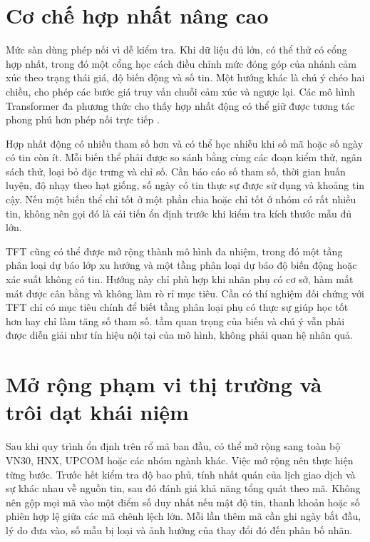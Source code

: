 \section{Cơ chế hợp nhất nâng cao}

Mức sàn dùng phép nối vì dễ kiểm tra. Khi dữ liệu đủ lớn, có thể thử có cổng hợp nhất, trong
đó một cổng học cách điều chỉnh mức đóng góp của nhánh cảm xúc theo trạng thái giá,
độ biến động và số tin. Một hướng khác là chú ý chéo hai chiều, cho phép các bước
giá truy vấn chuỗi cảm xúc và ngược lại. Các mô hình Transformer đa phương thức cho
thấy hợp nhất động có thể giữ được tương tác phong phú hơn phép nối trực tiếp
\cite{Omranpour2024_241210540v1,Elahi2024_241101368v1}.

Hợp nhất động có nhiều tham số hơn và có thể học nhiễu khi số mã hoặc số ngày có tin còn
ít. Mỗi biến thể phải được so sánh bằng cùng các đoạn kiểm thử, ngân sách thử, loại bỏ đặc
trưng và chỉ số. Cần báo cáo số tham số, thời gian huấn luyện, độ nhạy theo hạt giống, số
ngày có tin thực sự được sử dụng và khoảng tin cậy. Nếu một biến thể chỉ tốt ở một phần
chia hoặc chỉ tốt ở nhóm có rất nhiều tin, không nên gọi đó là cải tiến ổn định trước khi
kiểm tra kích thước mẫu đủ lớn.

TFT cũng có thể được mở rộng thành mô hình đa nhiệm, trong đó một tầng phân loại dự báo lớp xu
hướng và một tầng phân loại dự báo độ biến động hoặc xác suất không có tin. Hướng này chỉ phù hợp
khi nhãn phụ có cơ sở, hàm mất mát được cân bằng và không làm rò rỉ mục tiêu. Cần có thí nghiệm
đối chứng với TFT chỉ có mục tiêu chính để biết tầng phân loại phụ có thực sự giúp học tốt hơn hay
chỉ làm tăng số tham số. tầm quan trọng của biến và chú ý vẫn phải được diễn giải như
tín hiệu nội tại của mô hình, không phải quan hệ nhân quả.

\section{Mở rộng phạm vi thị trường và trôi dạt khái niệm}

Sau khi quy trình ổn định trên rổ mã ban đầu, có thể mở rộng sang toàn bộ VN30, HNX,
UPCOM hoặc các nhóm ngành khác. Việc mở rộng nên thực hiện từng bước. Trước hết kiểm
tra độ bao phủ, tính nhất quán của lịch giao dịch và sự khác nhau về nguồn tin, sau đó
đánh giá khả năng tổng quát theo mã. Không nên gộp mọi mã vào một điểm số duy nhất nếu
mật độ tin, thanh khoản hoặc số phiên hợp lệ giữa các mã chênh lệch lớn. Mỗi lần thêm
mã cần ghi ngày bắt đầu, lý do đưa vào, số mẫu bị loại và ảnh hưởng của thay đổi đó đến
phân bố nhãn.

